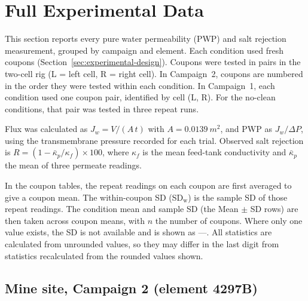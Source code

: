 \section{Full Experimental Data}
\label{app:exp-data}

This section reports every pure water permeability (PWP) and salt rejection measurement, grouped by campaign and element. Each condition used fresh coupons (Section~\ref{sec:experimental-design}). Coupons were tested in pairs in the two-cell rig (L = left cell, R = right cell). In Campaign~2, coupons are numbered in the order they were tested within each condition. In Campaign~1, each condition used one coupon pair, identified by cell (L, R). For the no-clean conditions, that pair was tested in three repeat runs.

Flux was calculated as $J_w = V/(A\,t)$ with $A = \qty{0.0139}{m^2}$, and PWP as $J_w/\Delta P$, using the transmembrane pressure recorded for each trial. Observed salt rejection is $R = (1-\bar{\kappa}_p/\kappa_f)\times 100$, where $\kappa_f$ is the mean feed-tank conductivity and $\bar{\kappa}_p$ the mean of three permeate readings.

In the coupon tables, the repeat readings on each coupon are first averaged to give a coupon mean. The within-coupon SD (SD$_\mathrm{w}$) is the sample SD of those repeat readings. The condition mean and sample SD (the Mean $\pm$ SD rows) are then taken across coupon means, with $n$ the number of coupons. Where only one value exists, the SD is not available and is shown as ---. All statistics are calculated from unrounded values, so they may differ in the last digit from statistics recalculated from the rounded values shown.

\subsection{Mine site, Campaign 2 (element 4297B)}
\label{app:exp-c2-mine}

